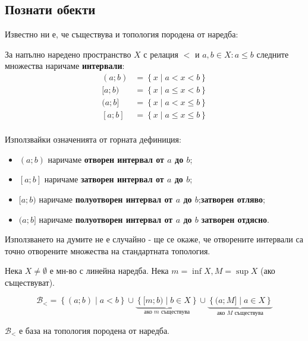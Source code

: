 \subsection{Познати обекти}
Известно ни е, че съществува и топология породена от наредба:
\begin{definition}
    За напълно наредено пространство $X$ с релация $<$ и $a, b \in X: a \leq b$ следните множества наричаме \textbf{интервали}:
    \begin{equation*}
        \begin{split}
            (a; b) & = \left\{x\mid a < x < b\right\} \\
            [a; b) & = \left\{x\mid a \leq x < b\right\} \\
            (a; b] & = \left\{x\mid a < x \leq b\right\} \\
            [a; b] & = \left\{x\mid a \leq x \leq b\right\} \\
        \end{split}
    \end{equation*}
\end{definition}
\begin{notation}
    Използвайки означенията от горната дефиниция:
    \begin{itemize}
        \item $(a; b)$ наричаме \textbf{отворен интервал от $a$ до $b$};
        \item $[a; b]$ наричаме \textbf{затворен интервал от $a$ до $b$};
        \item $[a; b)$ наричаме \textbf{полуотворен интервал от $a$ до $b$};\textbf{затворен отляво};
        \item $(a; b]$ наричаме \textbf{полуотворен интервал от $a$ до $b$} \textbf{затворен отдясно}.
    \end{itemize}
\end{notation}
Използването на думите не е случайно - ще се окаже, че отворените интервали са точно отворените множества на стандартната топология.
\begin{definition}
    Нека $X \neq \emptyset$ е мн-во с линейна наредба. Нека $m=\inf X, M=\sup X$ (ако съществуват). 

    \begin{equation*}
        \mathcal B_< = \left\{(a;b) \mid a < b\right\} \cup \underbrace{\left\{ [m; b) \mid b \in X \right\}}_{\text{ако $m$ съществува}} \cup \underbrace{\left\{ (a; M] \mid a \in X \right\}}_{\text{ако $M$ съществува}}
    \end{equation*}
\end{definition}
\begin{notation}
    $\mathcal B_<$ е база на топология породена от наредба.
\end{notation}

